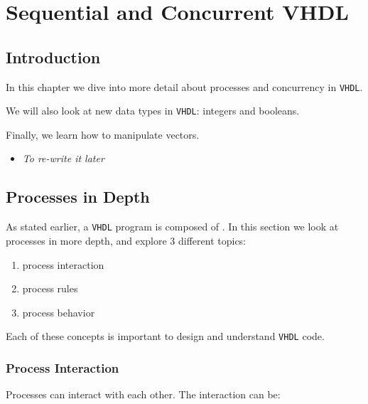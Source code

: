 

\chapter{Sequential and Concurrent VHDL}

\section{Introduction}

In this chapter we dive into more detail about processes and concurrency in \verb|VHDL|.

We will also look at new data types in \verb|VHDL|: integers and booleans.

Finally, we learn how to manipulate vectors.\\


\begin{itemize}
\item  \textit{To re-write it later}
\end{itemize}


\newpage
\section{Processes in Depth}
\label{sec:processes_more}



As stated earlier, a \verb|VHDL| program is composed of .
In this section we look at processes in more depth, and explore 3 different topics:

\begin{enumerate}
\item process interaction

\item process rules

\item process behavior

\end{enumerate}

Each of these concepts is important to design and understand \verb|VHDL| code.

\subsection{Process Interaction}
\label{sub:process_interact}

Processes can interact with each other. The interaction can be:


